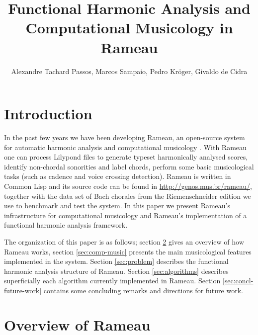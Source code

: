 \documentclass[a0paper]{sciposter}
\title{Functional Harmonic Analysis and Computational Musicology in
  Rameau}
\author{Alexandre Tachard Passos, Marcos Sampaio, Pedro Kröger,
  Givaldo de Cidra}
\institute{Genos---Computer Music Research Group \\
Federal University of Bahia (UFBA). Salvador, Brazil}
\begin{document}



\maketitle

\begin{multicols}{3}

\section{Introduction}
\label{sec:introduction}

In the past few years we have been developing Rameau, an open-source
system for automatic harmonic analysis and computational musicology
\cite{kroger08:rameau}. With Rameau one can process Lilypond files to
generate typeset harmonically analysed scores, identify non-chordal
sonorities and label chords, perform some basic musicological tasks
(such as cadence and voice crossing detection). Rameau is written in
Common Lisp and its source code can be found in
\url{http://genos.mus.br/rameau/}, together with the data set of Bach
chorales from the Riemenschneider \cite{bach41:371} edition we use to
benchmark and test the system. In this paper we present Rameau's
infrastructure for computational musicology and Rameau's
implementation of a functional harmonic analysis framework.

The organization of this paper is as follows; section \ref{sec:system}
gives an overview of how Rameau works, section \ref{sec:comp-music}
presents the main musicological features implemented in the
system. Section \ref{sec:problem} describes the functional harmonic
analysis structure of Rameau. Section \ref{sec:algorithms} describes
superficially each algorithm currently implemented in Rameau. Section
\ref{sec:concl-future-work} contains some concluding remarks and
directions for future work.

\section{Overview of Rameau}
\label{sec:system}


\end{multicols}
\end{document}
